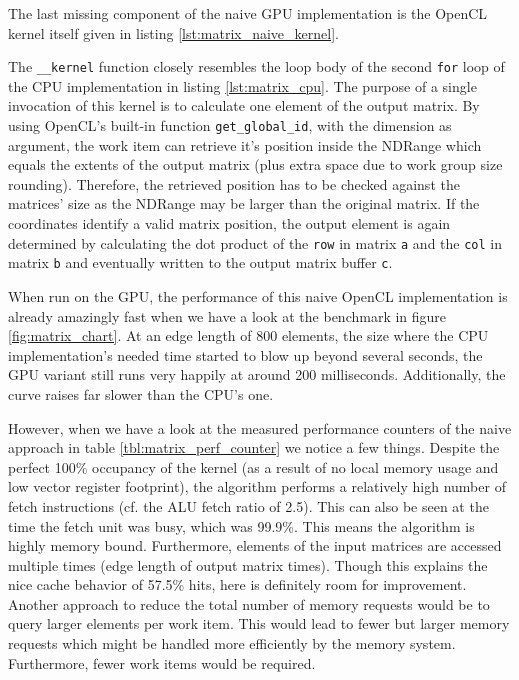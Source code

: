 The last missing component of the naive GPU implementation is the OpenCL kernel itself given in listing \ref{lst:matrix_naive_kernel}.



The \lstinline!__kernel! function closely resembles the loop body of the second \lstinline!for! loop of the CPU implementation in listing \ref{lst:matrix_cpu}. The purpose of a single invocation of this kernel is to calculate one element of the output matrix. By using OpenCL's built-in function \lstinline!get_global_id!, with the dimension as argument, the work item can retrieve it's position inside the NDRange which equals the extents of the output matrix (plus extra space due to work group size rounding). Therefore, the retrieved position has to be checked against the matrices' size as the NDRange may be larger than the original matrix. If the coordinates identify a valid matrix position, the output element is again determined by calculating the dot product of the \lstinline!row! in matrix \lstinline!a! and the \lstinline!col! in matrix \lstinline!b! and eventually written to the output matrix buffer \lstinline!c!.

When run on the GPU, the performance of this naive OpenCL implementation is already amazingly fast when we have a look at the benchmark in figure \ref{fig:matrix_chart}. At an edge length of 800 elements, the size where the CPU implementation's needed time started to blow up beyond several seconds, the GPU variant still runs very happily at around 200 milliseconds. Additionally, the curve raises far slower than the CPU's one.

However, when we have a look at the measured performance counters of the naive approach in table \ref{tbl:matrix_perf_counter} we notice a few things. Despite the perfect 100\% occupancy of the kernel (as a result of no local memory usage and low vector register footprint), the algorithm performs a relatively high number of fetch instructions (cf. the ALU fetch ratio of 2.5). This can also be seen at the time the fetch unit was busy, which was 99.9\%. This means the algorithm is highly memory bound. Furthermore, elements of the input matrices are accessed multiple times (edge length of output matrix times). Though this explains the nice cache behavior of 57.5\% hits, here is definitely room for improvement.
Another approach to reduce the total number of memory requests would be to query larger elements per work item. This would lead to fewer but larger memory requests which might be handled more efficiently by the memory system. Furthermore, fewer work items would be required.

